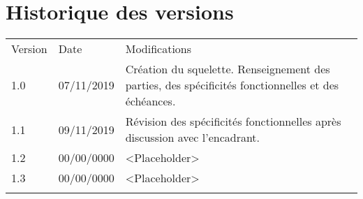 \section{\textbf{Historique des versions}}

\begin{tabular}{!{\color{white}\vrule}m{1.3cm}!{\color{white}\vrule}m{2cm}!{\color{white}\vrule}m{12.2cm}!{\color{white}\vrule}}

\hline
 \color{white} Version & \color{white} Date & \color{white} Modifications\\

\hline
{} 1.0 & 07/11/2019 & Création du squelette. Renseignement des parties, des spécificités fonctionnelles et des échéances. \\

\hline
{} 1.1 & 09/11/2019 & Révision des spécificités fonctionnelles après discussion avec l'encadrant. \\

\hline
{} 1.2 & 00/00/0000 & <Placeholder>\\

\hline
{} 1.3 & 00/00/0000 & <Placeholder>\\

\hline

\end{tabular}